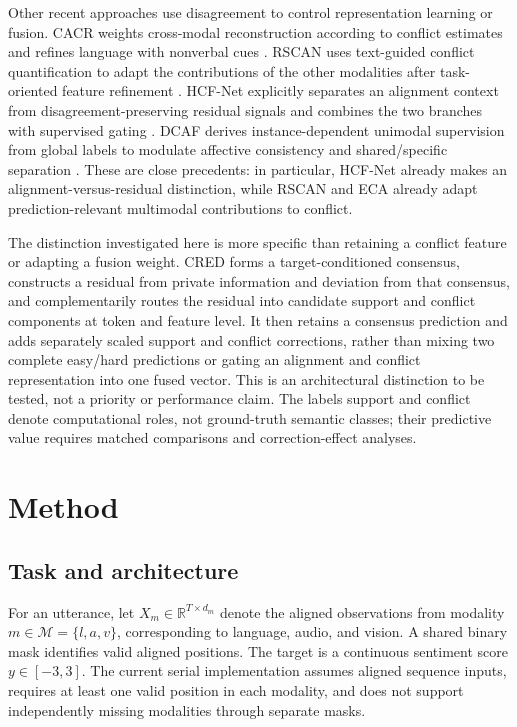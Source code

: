 \documentclass[review,12pt]{elsarticle}
\newcommand{\R}{\mathbb{R}}
\begin{document}
Other recent approaches use disagreement to control representation learning or fusion. CACR weights cross-modal reconstruction according to conflict estimates and refines language with nonverbal cues \cite{cacr}. RSCAN uses text-guided conflict quantification to adapt the contributions of the other modalities after task-oriented feature refinement \cite{rscan}. HCF-Net explicitly separates an alignment context from disagreement-preserving residual signals and combines the two branches with supervised gating \cite{hcfnet}. DCAF derives instance-dependent unimodal supervision from global labels to modulate affective consistency and shared/specific separation \cite{dcaf}. These are close precedents: in particular, HCF-Net already makes an alignment-versus-residual distinction, while RSCAN and ECA already adapt prediction-relevant multimodal contributions to conflict.

The distinction investigated here is more specific than retaining a conflict feature or adapting a fusion weight. CRED forms a target-conditioned consensus, constructs a residual from private information and deviation from that consensus, and complementarily routes the residual into candidate support and conflict components at token and feature level. It then retains a consensus prediction and adds separately scaled support and conflict corrections, rather than mixing two complete easy/hard predictions or gating an alignment and conflict representation into one fused vector. This is an architectural distinction to be tested, not a priority or performance claim. The labels support and conflict denote computational roles, not ground-truth semantic classes; their predictive value requires matched comparisons and correction-effect analyses.

\section{Method}
\subsection{Task and architecture}
For an utterance, let $X_m\in\R^{T\times d_m}$ denote the aligned observations from modality $m\in\mathcal M=\{l,a,v\}$, corresponding to language, audio, and vision. A shared binary mask identifies valid aligned positions. The target is a continuous sentiment score $y\in[-3,3]$. The current serial implementation assumes aligned sequence inputs, requires at least one valid position in each modality, and does not support independently missing modalities through separate masks.
\end{document}
